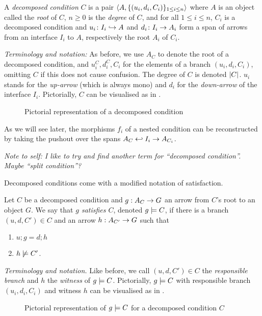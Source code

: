 \begin{definition}
  A \emph{decomposed condition} $C$ is a pair $\langle{A,\{{(u_i,d_i,C_i)}\}_{1\leq i\leq n}}\rangle$ where $A$ is an object called the \emph{root} of $C$, $n\geq 0$ is the \emph{degree} of $C$, and for all $1\leq i\leq n$, $C_i$ is a decomposed condition and $u_i\colon I_i\hookrightarrow A$ and $d_i\colon I_i\rightarrow A_i$ form a span of arrows from an interface $I_i$ to $A$, respectively the root $A_i$ of $C_i$.
\end{definition}
%
\emph{Terminology and notation:} As before, we use $A_C$ to denote the root of a decomposed condition, and $u^C_i,d^C_i,C_i$ for the elements of a branch $(u_i,d_i,C_i)$, omitting $C$ if this does not cause confusion. The degree of $C$ is denoted $|{C}|$. $u_i$ stands for the \emph{up-arrow} (which is always mono) and $d_i$ for the \emph{down-arrow} of the interface $I_i$. Pictorially, $C$ can be visualised as in .
%
\begin{figure}
  \centering
  
  \caption{Pictorial representation of a decomposed condition}
\end{figure}
%
As we will see later, the morphisms $f_i$ of a nested condition can be reconstructed by taking the pushout over the spans $A_C\hookleftarrow I_i\rightarrow A_{C_i}$.

\medskip\noindent\emph{Note to self: I like to try and find another term for ``decomposed condition''. Maybe ``split condition''?}

\medskip\noindent Decomposed conditions come with a modified notation of satisfaction.

\begin{definition}
  Let $C$ be a decomposed condition and $g:A_C\rightarrow G$ an arrow from $C$'s root to an object $G$. We say that \emph{$g$ satisfies $C$}, denoted $g\models C$, if there is a branch $(u,d,C')\in C$ and an arrow $h:A_{C'}\rightarrow G$ such that
  \begin{enumerate}
  \item $u;g=d;h$
  \item $h\not\models C'$.
  \end{enumerate}
\end{definition}
%

\emph{Terminology and notation.} Like before, we call $(u,d,C')\in C$ the \emph{responsible branch} and $h$ the \emph{witness} of $g\models C$. Pictorially, $g\models C$ with responsible branch $(u_i,d_i,C_i)$ and witness $h$ can be visualised as in .
%
\begin{figure}
  \centering
  
  \caption{Pictorial representation of $g\models C$ for a decomposed condition $C$}
\end{figure}

